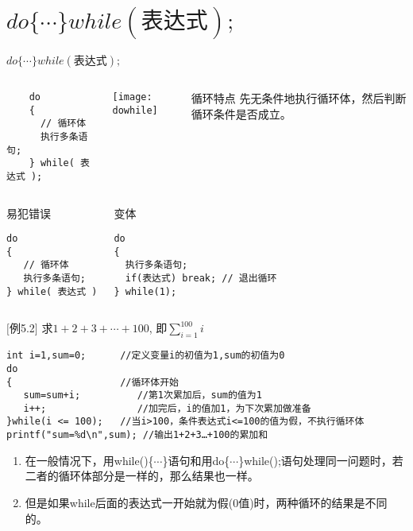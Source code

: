 \section{$do \{\cdots\} while(\text{表达式});$}

\begin{frame}{$do \{\cdots\} while(\text{表达式});$}
\vspace{-0.4cm}
\begin{columns}
	\begin{lstlisting} 
    do  
    {
      // 循环体
      执行多条语句;  
    } while( 表达式 );  
    \end{lstlisting}
	\texttt{[image: dowhile]}
	\begin{block}{循环特点}
		先无条件地执行循环体，然后判断循环条件是否成立。
	\end{block}
\end{columns}
\vspace{-0.5cm}
\begin{columns}
\begin{block}{易犯错误}
\begin{lstlisting} 
do  
{
   // 循环体
   执行多条语句;  
} while( 表达式 )
\end{lstlisting}
\end{block}
\begin{block}{变体}
\begin{lstlisting} 
do  
{
  执行多条语句;  
  if(表达式) break; // 退出循环  
} while(1);
\end{lstlisting}
\end{block}
\end{columns}
\end{frame}

\begin{frame}
$[$例5.2$]$ 求$1+2+3+\cdots+100$, 即$\sum\limits_{i=1}^{100}i$
\medskip
\begin{lstlisting}[frame=lines]
int i=1,sum=0;      //定义变量i的初值为1,sum的初值为0  
do     
{                   //循环体开始
   sum=sum+i;          //第1次累加后，sum的值为1
   i++;                //加完后，i的值加1，为下次累加做准备
}while(i <= 100);   //当i>100，条件表达式i<=100的值为假，不执行循环体
printf("sum=%d\n",sum); //输出1+2+3…+100的累加和                
\end{lstlisting}
\begin{enumerate}
	\setlength{\itemsep}{.2cm}
	\item 在一般情况下，用while()\{$\cdots$\}语句和用do\{$\cdots$\}while();语句处理同一问题时，若二者的循环体部分是一样的，那么结果也一样。
	\item 但是如果while后面的表达式一开始就为假(0值)时，两种循环的结果是不同的。
\end{enumerate}
\end{frame}

